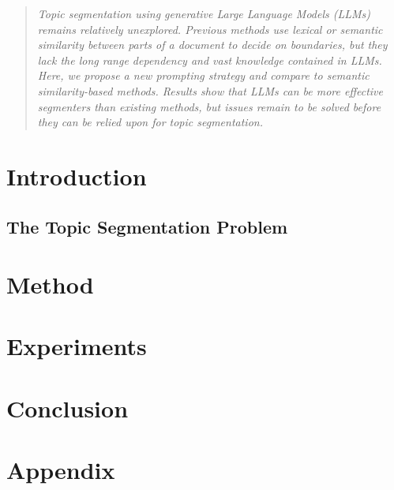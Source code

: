 \documentclass{article}
\begin{document}

\begin{abstract}
\emph{
    Topic segmentation using generative Large Language Models (LLMs) remains relatively unexplored. Previous methods use lexical or semantic similarity between parts of a document to decide on boundaries, but they lack the long range dependency and vast knowledge contained in LLMs. Here, we propose a new prompting strategy and compare to semantic similarity-based methods. Results show that LLMs can be more effective segmenters than existing methods, but issues remain to be solved before they can be relied upon for topic segmentation.
}
\end{abstract}

\section{Introduction}

\subsection{The Topic Segmentation Problem}



\section{Method}




\section{Experiments}\label{Results}



\section{Conclusion}\label{Conclusion}







\appendix
\section{Appendix}\label{Appendix}

\end{document}

